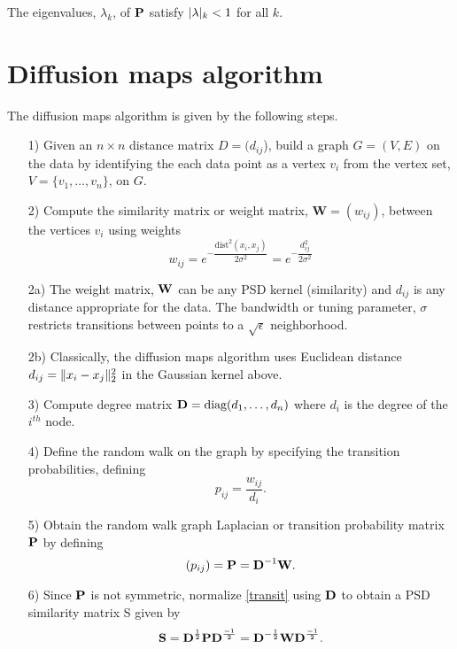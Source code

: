 The eigenvalues, $\lambda_{k}$, of $\textbf{P}$ satisfy $\lvert\lambda\rvert_{k} < 1$
for all $k$.

\section{Diffusion maps algorithm}\label{diffusion maps}
The diffusion maps algorithm is given by the following steps.
\begin{itemize}
\item[1)] Given an $n \times n$ distance matrix $D = (d_{ij}$), build a graph $G = (V,E)$ on the data by identifying the each data point
as a vertex $v_{i}$ from the vertex set, $V = \{v_{1}, \ldots, v_{n}\}$, on  $G$.
\item[2)] Compute the similarity matrix or weight matrix, $\bm{W} = (w_{ij})$, between the vertices $v_{i}$ using weights
\[
w_{ij} = e^{-\dfrac{\text{dist}^{2}(x_{i}, x_{j})}{2\sigma^2}} 
= e^{-\dfrac{d_{ij}^{2}}{2\sigma^2}}
\] 
\item[2a)] The weight matrix, $\textbf{W}$ can be any PSD kernel (similarity) and $d_{ij}$ is any distance appropriate for the data. The bandwidth or tuning parameter, $\sigma$ restricts transitions between points to a $\sqrt{\epsilon}$ neighborhood.
\item[2b)] Classically, the diffusion maps algorithm uses Euclidean distance 
$d_{ij} = \lVert x_{i} - x_{j}\rVert^{2}_{2}$ in the Gaussian kernel above.
\item[3)] Compute degree matrix $\textbf{D} = \text{diag}(d_{1}, \ldots, d_{n})$
where $d_{i}$ is the degree of the $i^{th}$ node.
\item[4)] Define the random walk on the graph by specifying the transition probabilities, defining 
\[
p_{ij} = \frac{w_{ij}}{d_{i}}.
\]
\item[5)] Obtain the random walk graph Laplacian or transition probability
matrix $\textbf{P}$ by defining 
\begin{equation}\label{transit} 
(p_{ij}) = \textbf{P} = \textbf{D}^{-1}\textbf{W}.
\end{equation}

\item[6)] Since $\textbf{P}$ is not symmetric, normalize \eqref{transit}
using $\textbf{D}$ to obtain a PSD similarity matrix S given by
\begin{equation}\label{simPSD}
\textbf{S} = \textbf{D}^{\frac{1}{2}}\textbf{P}\textbf{D}^{\frac{-1}{2}} = \textbf{D}^{-\frac{1}{2}}\textbf{W}\textbf{D}^{\frac{-1}{2}}. 
\end{equation} 


\end{itemize}
